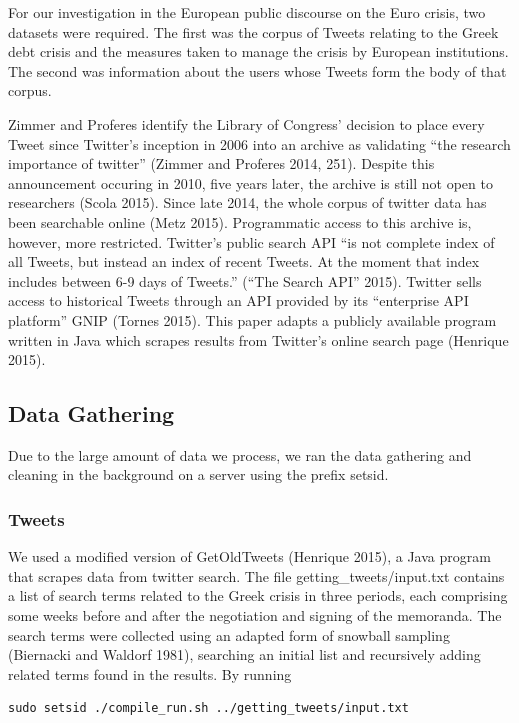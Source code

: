\documentclass[]{article}
\begin{document}
For our investigation in the European public discourse on the Euro
crisis, two datasets were required. The first was the corpus of Tweets
relating to the Greek debt crisis and the measures taken to manage the
crisis by European institutions. The second was information about the
users whose Tweets form the body of that corpus.

Zimmer and Proferes identify the Library of Congress' decision to place
every Tweet since Twitter's inception in 2006 into an archive as
validating ``the research importance of twitter'' (Zimmer and Proferes
2014, 251). Despite this announcement occuring in 2010, five years
later, the archive is still not open to researchers (Scola 2015). Since
late 2014, the whole corpus of twitter data has been searchable online
(Metz 2015). Programmatic access to this archive is, however, more
restricted. Twitter's public search API ``is not complete index of all
Tweets, but instead an index of recent Tweets. At the moment that index
includes between 6-9 days of Tweets.'' (``The Search API'' 2015).
Twitter sells access to historical Tweets through an API provided by its
``enterprise API platform'' GNIP (Tornes 2015). This paper adapts a
publicly available program written in Java which scrapes results from
Twitter's online search page (Henrique 2015).

\subsection{Data Gathering}\label{data-gathering}

Due to the large amount of data we process, we ran the data gathering
and cleaning in the background on a server using the prefix setsid.

\subsubsection{Tweets}\label{tweets}

We used a modified version of GetOldTweets (Henrique 2015), a Java
program that scrapes data from twitter search. The file
getting\_tweets/input.txt contains a list of search terms related to the
Greek crisis in three periods, each comprising some weeks before and
after the negotiation and signing of the memoranda. The search terms
were collected using an adapted form of snowball sampling (Biernacki and
Waldorf 1981), searching an initial list and recursively adding related
terms found in the results. By running

\begin{verbatim}
sudo setsid ./compile_run.sh ../getting_tweets/input.txt
\end{verbatim}
\end{document}
